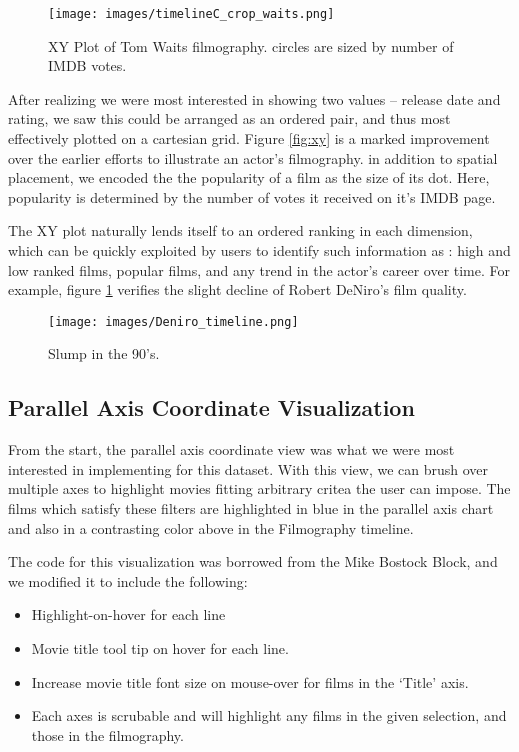 \documentclass[12pt]{article}
\begin{document}
\begin{figure}
	\centering
	\texttt{[image: images/timelineC\_crop\_waits.png]}
				  \caption{XY Plot of Tom Waits filmography.  circles are sized by number of  IMDB votes.}
\end{figure}\label{fig:xy}


After realizing we were most interested in showing two values -- release date and rating, we saw this could be arranged as an ordered pair, and thus most effectively plotted on a cartesian grid.  Figure \ref{fig:xy} is a marked improvement over the earlier efforts to illustrate an actor's filmography.  in addition to spatial placement, we encoded the the popularity of a film as the size of its dot.  Here, popularity is determined by the number of votes it received on it's IMDB page.

The XY plot naturally lends itself to an ordered ranking in each dimension, which can be quickly exploited by users to identify such information as : high and low ranked films, popular films, and any trend in the actor's career over time.  For example, figure \ref{fig:deniro} verifies the slight decline of  Robert DeNiro's film quality.

\begin{figure}\label{fig:deniro}
	\centering
	\texttt{[image: images/Deniro\_timeline.png]}
				  \caption{Slump in the 90's.}
\end{figure}

\newpage 

\subsection{Parallel Axis Coordinate Visualization}
	
From the start, the parallel axis coordinate view was what we were most interested in implementing for this dataset. With this view, we can brush over multiple axes to highlight movies fitting arbitrary critea the user can impose.  The films which satisfy these filters are highlighted in blue in the parallel axis chart and also in a contrasting color above in the Filmography timeline.

The code for this visualization was borrowed from the Mike Bostock Block, and we modified it to include the following:

\begin{itemize}
	\item Highlight-on-hover  for each line
	\item Movie title tool tip on hover for each line.
	\item Increase movie title font size on mouse-over for films  in the `Title' axis.
	\item Each axes is scrubable and will highlight any films in the given selection, and those in the filmography.
\end{itemize}
\end{document}
